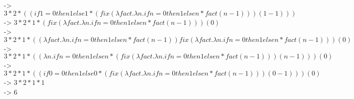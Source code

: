 \documentclass{article}
\theoremstyle{theorem}
\theoremstyle{definition}
\theoremstyle{remark}
\begin{document}
-> $3 * 2 * ((if 1=0 then 1 else 1 * (fix(\lambda fact.\lambda n.if n=0 then 1 else n * fact (n-1))) (1-1)))$ \\
-> $3 * 2 * 1 * (fix(\lambda fact.\lambda n.if n=0 then 1 else n * fact (n-1))) (0)$ \\
-> $3 * 2 * 1 * ((\lambda fact.\lambda n.if n=0 then 1 else n * fact (n-1)) fix(\lambda fact.\lambda n.if n=0 then 1 else n * fact (n-1))) (0)$ \\
-> $3 * 2 * 1 * ((\lambda n.if n=0 then 1 else n * (fix(\lambda fact.\lambda n.if n=0 then 1 else n * fact (n-1))) (n-1))) (0)$ \\
-> $3 * 2 * 1 * ((if 0=0 then 1 else 0 * (fix(\lambda fact.\lambda n.if n=0 then 1 else n * fact (n-1))) (0-1))) (0)$ \\
-> $3 * 2 * 1 * 1$ \\
-> $6$
\end{document}
